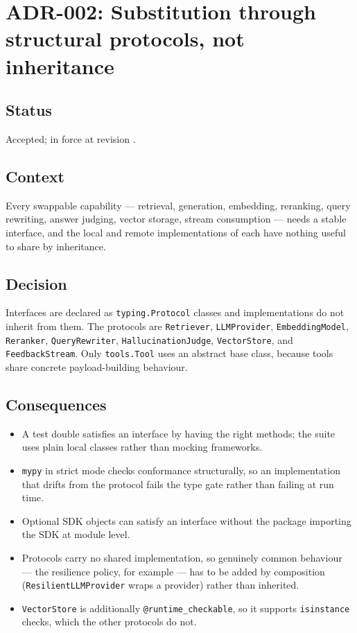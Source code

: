 \section{ADR-002: Substitution through structural protocols, not inheritance}
\label{adr:002}

\subsection*{Status}

Accepted; in force at revision \texttt{\projectrevisionshort}.

\subsection*{Context}

Every swappable capability --- retrieval, generation, embedding, reranking,
query rewriting, answer judging, vector storage, stream consumption --- needs a
stable interface, and the local and remote implementations of each have nothing
useful to share by inheritance.

\subsection*{Decision}

Interfaces are declared as \texttt{typing.Protocol} classes and implementations
do not inherit from them. The protocols are \texttt{Retriever},
\texttt{LLMProvider}, \texttt{EmbeddingModel}, \texttt{Reranker},
\texttt{QueryRewriter}, \texttt{HallucinationJudge}, \texttt{VectorStore}, and
\texttt{FeedbackStream}. Only \texttt{tools.Tool} uses an abstract base class,
because tools share concrete payload-building behaviour.

\subsection*{Consequences}

\begin{itemize}
  \item A test double satisfies an interface by having the right methods; the
    suite uses plain local classes rather than mocking frameworks.
  \item \texttt{mypy} in strict mode checks conformance structurally, so an
    implementation that drifts from the protocol fails the type gate rather
    than failing at run time.
  \item Optional SDK objects can satisfy an interface without the package
    importing the SDK at module level.
  \item Protocols carry no shared implementation, so genuinely common
    behaviour --- the resilience policy, for example --- has to be added by
    composition (\texttt{ResilientLLMProvider} wraps a provider) rather than
    inherited.
  \item \texttt{VectorStore} is additionally \texttt{@runtime\_checkable}, so
    it supports \texttt{isinstance} checks, which the other protocols do not.
\end{itemize}

